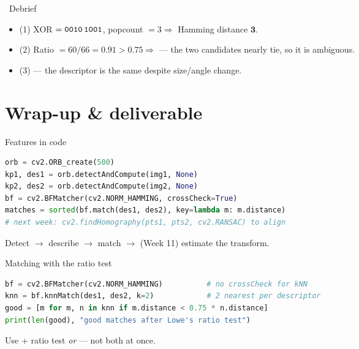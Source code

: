 \documentclass[10pt,aspectratio=169]{beamer}
\begin{document}
\begin{frame}{\faPen~Debrief}
  \begin{itemize}
    \item (1) XOR $=\texttt{0010\,1001}$, popcount $=3 \Rightarrow$ Hamming distance $\mathbf{3}$.
    \item (2) Ratio $=60/66=0.91>0.75 \Rightarrow$  — the two candidates nearly tie, so it is ambiguous.
    \item (3)  — the descriptor is the same despite size/angle change.
  \end{itemize}
\end{frame}

\section{Wrap-up \& deliverable}

\begin{frame}[fragile]{Features in code}
\begin{lstlisting}[language=Python]
orb = cv2.ORB_create(500)
kp1, des1 = orb.detectAndCompute(img1, None)
kp2, des2 = orb.detectAndCompute(img2, None)
bf = cv2.BFMatcher(cv2.NORM_HAMMING, crossCheck=True)
matches = sorted(bf.match(des1, des2), key=lambda m: m.distance)
# next week: cv2.findHomography(pts1, pts2, cv2.RANSAC) to align
\end{lstlisting}
  Detect $\rightarrow$ describe $\rightarrow$ match $\rightarrow$ (Week 11) estimate the transform.
\end{frame}

\begin{frame}[fragile]{Matching with the ratio test}
\begin{lstlisting}[language=Python]
bf = cv2.BFMatcher(cv2.NORM_HAMMING)          # no crossCheck for kNN
knn = bf.knnMatch(des1, des2, k=2)            # 2 nearest per descriptor
good = [m for m, n in knn if m.distance < 0.75 * n.distance]
print(len(good), "good matches after Lowe's ratio test")
\end{lstlisting}
  \begin{goodbox}
    Use  + ratio test \emph{or}  — not both at once.
  \end{goodbox}
\end{frame}
\end{document}

